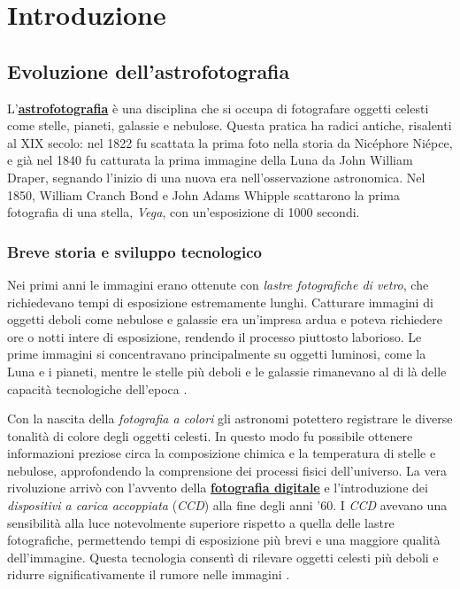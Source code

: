 \chapter{Introduzione} \label{chap:introduction}

\section{Evoluzione dell'astrofotografia} \label{sec:evolution}

L'\textbf{\href{https://it.wikipedia.org/wiki/Astrofotografia}{astrofotografia}} è una disciplina che si occupa di fotografare oggetti celesti come stelle, pianeti, galassie e nebulose. Questa pratica ha radici antiche, risalenti al XIX secolo: nel 1822 fu scattata la prima foto nella storia da Nicéphore Niépce, e già nel 1840 fu catturata la prima immagine della Luna da John William Draper, segnando l'inizio di una nuova era nell'osservazione astronomica. Nel 1850, William Cranch Bond e John Adams Whipple scattarono la prima fotografia di una stella, \textit{Vega}, con un'esposizione di 1000 secondi.

\subsection{Breve storia e sviluppo tecnologico} \label{subsec:history}

Nei primi anni le immagini erano ottenute con \textit{lastre fotografiche di vetro}, che richiedevano tempi di esposizione estremamente lunghi. Catturare immagini di oggetti deboli come nebulose e galassie era un'impresa ardua e poteva richiedere ore o notti intere di esposizione, rendendo il processo piuttosto laborioso. Le prime immagini si concentravano principalmente su oggetti luminosi, come la Luna e i pianeti, mentre le stelle più deboli e le galassie rimanevano al di là delle capacità tecnologiche dell'epoca \cite{astroph_hist}.

Con la nascita della \textit{fotografia a colori} gli astronomi potettero registrare le diverse tonalità di colore degli oggetti celesti. In questo modo fu possibile ottenere informazioni preziose circa la composizione chimica e la temperatura di stelle e nebulose, approfondendo la comprensione dei processi fisici dell'universo. La vera rivoluzione arrivò con l'avvento della \textbf{\href{https://it.wikipedia.org/wiki/Fotografia_digitale}{fotografia digitale}} e l'introduzione dei \textit{dispositivi a carica accoppiata} (\textit{CCD}) alla fine degli anni '60. I \textit{CCD} avevano una sensibilità alla luce notevolmente superiore rispetto a quella delle lastre fotografiche, permettendo tempi di esposizione più brevi e una maggiore qualità dell'immagine. Questa tecnologia consentì di rilevare oggetti celesti più deboli e ridurre significativamente il rumore nelle immagini \cite{multiwavelength_image_proc}.

